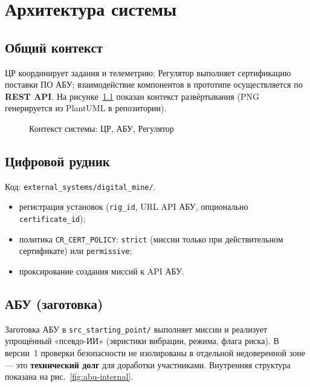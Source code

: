 \chapter{Архитектура системы}
\label{ch:architecture}

\section{Общий контекст}

ЦР координирует задания и телеметрию; Регулятор выполняет сертификацию поставки ПО АБУ; взаимодействие компонентов в прототипе осуществляется по \textbf{REST API}. На рисунке~\ref{fig:context} показан контекст развёртывания (PNG генерируется из PlantUML в репозитории).

\begin{figure}[htbp]
  \centering
  \caption{Контекст системы: ЦР, АБУ, Регулятор}
  \label{fig:context}
\end{figure}

\section{Цифровой рудник}

Код: \texttt{external\_systems/digital\_mine/}.

\begin{itemize}
  \item регистрация установок (\texttt{rig\_id}, URL API АБУ, опционально \texttt{certificate\_id});
  \item политика \texttt{CR\_CERT\_POLICY}: \texttt{strict} (миссии только при действительном сертификате) или \texttt{permissive};
  \item проксирование создания миссий к API АБУ.
\end{itemize}

\section{АБУ (заготовка)}

Заготовка АБУ в \texttt{src\_starting\_point/} выполняет миссии и реализует упрощённый «псевдо-ИИ» (эвристики вибрации, режима, флага риска). В версии~1 проверки безопасности не изолированы в отдельной недоверенной зоне --- это \textbf{технический долг} для доработки участниками. Внутренняя структура показана на рис.~\ref{fig:abu-internal}.

